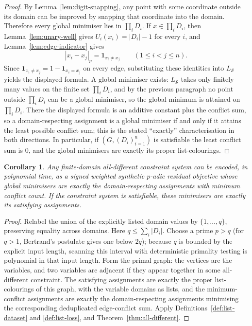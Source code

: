 \documentclass[11pt]{article}
\newtheorem{corollary}[theorem]{Corollary}
\begin{document}
\begin{proof}
By Lemma~\ref{lem:digit-snapping}, any point with some coordinate outside its domain can be improved by snapping that coordinate into the domain. Therefore every global minimiser lies in \(\prod_i D_i\). If \(x\in \prod_i D_i\), then Lemma~\ref{lem:unary-well} gives \(U_i(x_i)=|D_i|-1\) for every \(i\), and Lemma~\ref{lem:edge-indicator} gives
\[
|x_i-x_j|_p=\mathbf 1_{x_i\neq x_j}
\qquad (1\le i<j\le n).
\]
Since \(\mathbf 1_{x_i\neq x_j}=1-\mathbf 1_{x_i=x_j}\) on every edge, substituting these identities into \(L_{\mathcal S}\) yields the displayed formula. A global minimiser exists: \(L_{\mathcal S}\) takes only finitely many values on the finite set \(\prod_i D_i\), and by the previous paragraph no point outside \(\prod_i D_i\) can be a global minimiser, so the global minimum is attained on \(\prod_i D_i\). There the displayed formula is an additive constant plus the conflict sum, so a domain-respecting assignment is a global minimiser if and only if it attains the least possible conflict sum; this is the stated ``exactly'' characterisation in both directions. In particular, if \((G,(D_i)_{i=1}^n)\) is satisfiable the least conflict sum is \(0\), and the global minimisers are exactly its proper list-colourings.
\end{proof}

\begin{corollary}
\label{cor:all-different-csp}
Any finite-domain all-different constraint system can be encoded, in polynomial time, as a signed weighted synthetic $p$-adic residual objective whose global minimisers are exactly the domain-respecting assignments with minimum conflict count. If the constraint system is satisfiable, these minimisers are exactly its satisfying assignments.
\end{corollary}

\begin{proof}
Relabel the union of the explicitly listed domain values by \(\{1,\dots,q\}\), preserving equality across domains. Here \(q\leq\sum_i|D_i|\). Choose a prime \(p>q\) (for \(q>1\), Bertrand's postulate gives one below \(2q\)); because \(q\) is bounded by the explicit input length, scanning this interval with deterministic primality testing is polynomial in that input length. Form the primal graph: the vertices are the variables, and two variables are adjacent if they appear together in some all-different constraint. The satisfying assignments are exactly the proper list-colourings of this graph, with the variable domains as lists, and the minimum-conflict assignments are exactly the domain-respecting assignments minimising the corresponding deduplicated edge-conflict sum. Apply Definitions~\ref{def:list-dataset} and \ref{def:list-loss}, and Theorem~\ref{thm:all-different}.
\end{proof}
\end{document}

